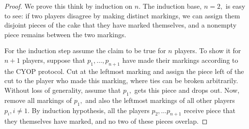 \documentclass[a4paper, 12pt]{article}
\begin{document}
\begin{proof}
We prove this think by induction on $n.$ The induction base, $n= 2,$ is easy to see: if two players disagree by making distinct markings, we can assign them disjoint pieces of the cake that they have marked themselves, and a nonempty piece remains between the two markings. 

For the induction step assume the claim to be true for $n$ players. To show it for $n + 1$ players, suppose that $p_1, \ldots, p_{n+1}$ have made their markings according to the CYOP protocol. Cut at the leftmost marking and assign the piece left of the cut to the player who made this marking, where ties can be broken arbitrarily. Without loss of generality, assume that $p_1,$ gets this piece and drops out. Now, remove all markings of $p_1,$ and also the leftmost markings of all other players $p_i, i \neq 1.$ By induction hypothesis, all the players $p_2, \ldots p_{n+1}$  receive piece that they themselves have marked, and no two of these pieces overlap. 


\end{proof}
\end{document}
